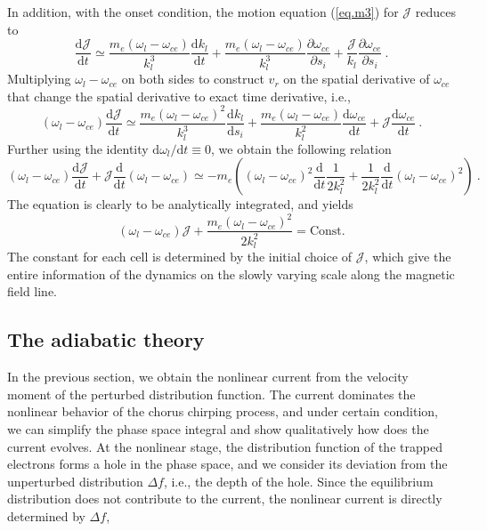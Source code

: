In addition, with the onset condition, the motion equation (\ref{eq.m3}) for $\mathcal{J}$ reduces to
\begin{equation}
        \frac{\mathrm{d}\mathcal{J}}{\mathrm{d}t} \simeq  \frac{m_e(\omega_l - \omega_{ce})}{k_l^3} \frac{\mathrm{d} k_l}{\mathrm{d} t} + \frac{m_e(\omega_l - \omega_{ce})}{k_l^3} \frac{\partial \omega_{ce}}{\partial s_i}  +\frac{\mathcal{J}}{k_l}\frac{\partial \omega_{ce}}{\partial s_i}~.
\end{equation}
Multiplying $\omega_l - \omega_{ce}$ on both sides to construct $v_r$ on the spatial derivative of $\omega_{ce}$ that change the spatial derivative to exact time derivative, i.e., 
\begin{equation}
    (\omega_l - \omega_{ce}) \frac{\mathrm{d}\mathcal{J}}{\mathrm{d}t} \simeq  \frac{m_e(\omega_l - \omega_{ce})^2}{k_l^3} \frac{\mathrm{d} k_l}{\mathrm{d} s_i} + \frac{m_e(\omega_l - \omega_{ce})}{k_l^2} \frac{\mathrm{d} \omega_{ce}}{\mathrm{d} t} + \mathcal{J}\frac{\mathrm{d} \omega_{ce}}{\mathrm{d} t}~.
\end{equation}
Further using the identity $\mathrm{d}\omega_l/\mathrm{d}t \equiv 0$, we obtain the following relation
\begin{equation}
    (\omega_l - \omega_{ce}) \frac{\mathrm{d}\mathcal{J}}{\mathrm{d}t} + \mathcal{J}\frac{\mathrm{d}}{\mathrm{d} t}(\omega_l - \omega_{ce}) \simeq - m_e\left((\omega_l - \omega_{ce})^2 \frac{\mathrm{d}}{\mathrm{d} t}\frac{1}{2 k_l^2} + \frac{1}{2 k_l^2} \frac{\mathrm{d}}{\mathrm{d} t}(\omega_l - \omega_{ce})^2\right)~.
\end{equation}
The equation is clearly to be analytically integrated, and yields
\begin{equation}\label{eq.Jcons}
    (\omega_l - \omega_{ce})\mathcal{J} +  \frac{m_e(\omega_l - \omega_{ce})^2}{2k_l^2} = \mathrm{Const.}
\end{equation}
The constant for each cell is determined by the initial choice of $\mathcal{J}$, which give the entire information of the dynamics on the slowly varying scale along the magnetic field line.

\subsection{The adiabatic theory}
In the previous section, we obtain the nonlinear current from the velocity moment of the perturbed distribution function. 
The current dominates the nonlinear behavior of the chorus chirping process, and under certain condition, we can simplify the phase space integral and show qualitatively how does the current evolves.
At the nonlinear stage, the distribution function of the trapped electrons forms a hole in the phase space, and we consider its deviation from the unperturbed distribution $\Delta f$, i.e., the depth of the hole.
Since the equilibrium distribution does not contribute to the current, the nonlinear current is directly determined by $\Delta f$, 

